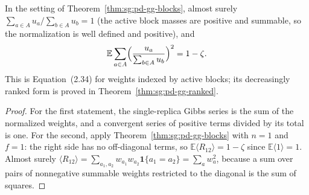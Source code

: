 \begin{corollary}\label{cor:sg:pd-weight-sq}
  \leanok
In the setting of Theorem~\ref{thm:sg:pd-gg-blocks}, almost surely $\sum_{a\in A}u_a/\sum_{b\in A}u_b=1$ (the active block masses are positive and summable, so the normalization is well defined and positive), and
\[
\mathbb E\sum_{a\in A}\Bigl(\frac{u_a}{\sum_{b\in A}u_b}\Bigr)^2=1-\zeta.
\]
This is Equation~(2.34) for weights indexed by active blocks; its decreasingly ranked form is proved in Theorem~\ref{thm:sg:pd-gg-ranked}.
\end{corollary}
\begin{proof}
  \leanok
For the first statement, the single-replica Gibbs series is the sum of the normalized weights, and a convergent series of positive terms divided by its total is one. For the second, apply Theorem~\ref{thm:sg:pd-gg-blocks} with $n=1$ and $f=1$: the right side has no off-diagonal terms, so $\mathbb E\langle R_{12}\rangle=1-\zeta$ since $\mathbb E\langle1\rangle=1$. Almost surely $\langle R_{12}\rangle=\sum_{a_1,a_2}w_{a_1}w_{a_2}\mathbf 1\{a_1=a_2\}=\sum_aw_a^2$, because a sum over pairs of nonnegative summable weights restricted to the diagonal is the sum of squares.
\end{proof}

